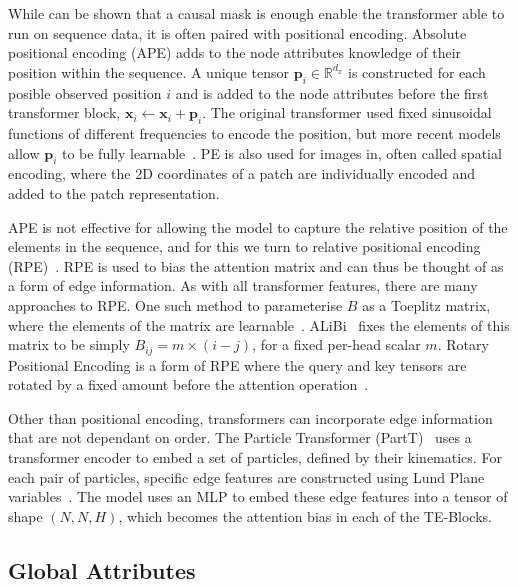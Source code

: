 While can be shown that a causal mask is enough enable the transformer able to run on sequence data, it is often paired with positional encoding.
Absolute positional encoding (APE) adds to the node attributes knowledge of their position within the sequence.
A unique tensor $\mathbf{p}_i \in \mathbb{R}^{d_x}$ is constructed for each posible observed position $i$ and is added to the node attributes before the first transformer block, $\mathbf{x}_i \leftarrow \mathbf{x}_i + \mathbf{p}_i$.
The original transformer used fixed sinusoidal functions of different frequencies to encode the position, but more recent models allow $\mathbf{p}_i$ to be fully learnable~.
PE is also used for images in, often called spatial encoding, where the 2D coordinates of a patch are individually encoded and added to the patch representation.

APE is not effective for allowing the model to capture the relative position of the elements in the sequence, and for this we turn to relative positional encoding (RPE)~.
RPE is used to bias the attention matrix and can thus be thought of as a form of edge information.
As with all transformer features, there are many approaches to RPE.
One such method to parameterise $B$ as a Toeplitz matrix, where the elements of the matrix are learnable~.
ALiBi~ fixes the elements of this matrix to be simply $B_{ij} = m\times(i - j)$, for a fixed per-head scalar $m$.
Rotary Positional Encoding is a form of RPE where the query and key tensors are rotated by a fixed amount before the attention operation~.

Other than positional encoding, transformers can incorporate edge information that are not dependant on order.
The Particle Transformer (PartT)~ uses a transformer encoder to embed a set of particles, defined by their kinematics.
For each pair of particles, specific edge features are constructed using Lund Plane variables~.
The model uses an MLP to embed these edge features into a tensor of shape $(N, N, H)$, which becomes the attention bias in each of the TE-Blocks.

\subsection{Global Attributes}

